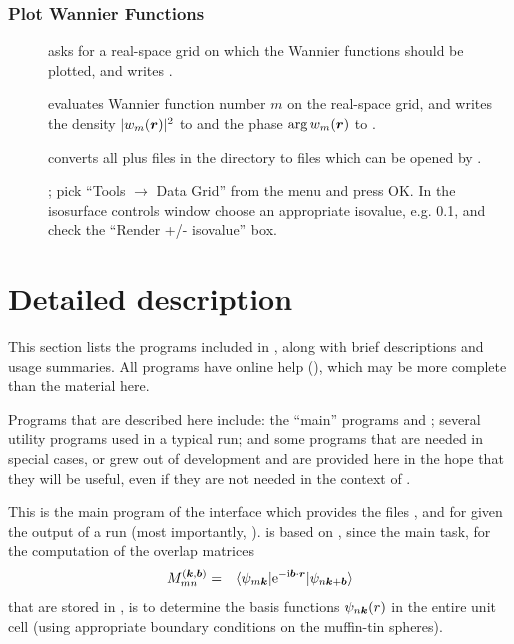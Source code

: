 \subsection{Plot Wannier Functions}
\begin{description}
\item[\writeinwplot] asks for a real-space grid on which the
  Wannier functions should be plotted, and writes
  .
\item[] evaluates Wannier function number
  $m$ on the real-space grid, and writes the density $|w_m(\boldsymbol r)|^2$
  to  and the phase $\arg w_m(\boldsymbol r)$
  to .
\item [\wplottoxsf] converts all  plus
   files in the directory to  files
  which can be opened by \xcrys.
\item [] ; pick
  ``Tools $\rightarrow$ Data Grid'' from the menu and press OK. In the
  isosurface controls window choose an appropriate isovalue, e.g. 0.1,
  and check the ``Render +/- isovalue'' box.
\end{description}


\chapter{Detailed description}
\label{sec:detaileddescription}
\minitoc

This section lists the programs included in \wtow, along with brief
descriptions and usage summaries.  All programs have online help
(), which may be more complete than the material here.

Programs that are described here include: the ``main'' \wtow programs
\wiiw and \wplot; several utility programs used in a typical \wtow
run; and some programs that are needed in special cases, or grew out
of \wtow development and are provided here in the hope that they will
be useful, even if they are not needed in the context of \wtow.



This is the main program of the interface which provides the files
,  and  for \wannier
given the output of a \wien run (most importantly,
).  \wiiw is based on , since the main
task, for the computation of the overlap matrices
\begin{eqnarray}
\label{eq:mmn}
M_{mn}^{(\boldsymbol{k},\boldsymbol{b})}&=&\langle
\psi_{m\boldsymbol{k}}|\text{e}^{-\text{i}\boldsymbol{b}\cdot\boldsymbol{r}}|\psi_{n\boldsymbol{k}+\boldsymbol{b}}
\rangle
\label{eq:mmn2}
\end{eqnarray}
that are stored in , is to determine the basis
functions $\psi_{n\boldsymbol k}(r)$ in the entire unit cell (using
appropriate boundary conditions on the muffin-tin spheres).


